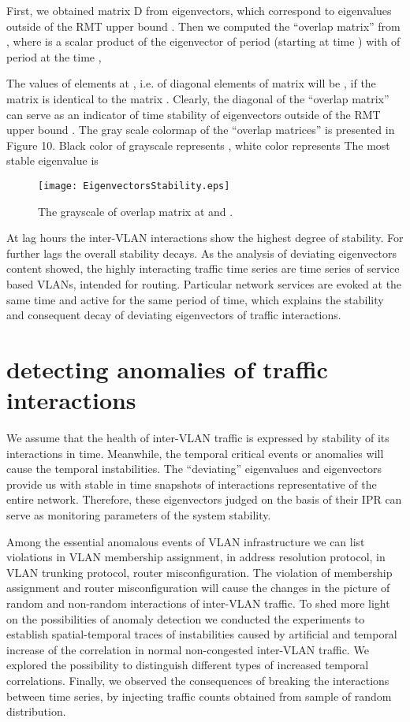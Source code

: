 \documentclass{IEEEtran}
\begin{document}
First, we obtained matrix D from  eigenvectors, which correspond
to  eigenvalues outside of the RMT upper bound .
Then we computed the {}``overlap matrix'' 
from , where  is a scalar product of the
eigenvector  of period  (starting at time ) with
 of period  at the time ,


The values of  elements at , i.e.
of diagonal elements of matrix  will be , if the matrix 
is identical to the matrix . Clearly, the diagonal
of the {}``overlap matrix''  can serve as an indicator of time
stability of  eigenvectors outside of the RMT upper bound .
The gray scale colormap of the {}``overlap matrices'' 
is presented in Figure 10. Black color of grayscale represents ,
white color represents  The most stable eigenvalue is
\begin{figure}[h]
\begin{center}\texttt{[image: EigenvectorsStability.eps]}\end{center}


\caption{\label{10} The grayscale of overlap matrix 
at  and . }
\end{figure}
At lag  hours the inter-VLAN interactions show the highest
degree of stability. For further lags the overall stability decays.
As the analysis of deviating eigenvectors content showed, the highly
interacting traffic time series are time series of service based VLANs,
intended for routing. Particular network services are evoked at the
same time and active for the same period of time, which explains the
stability and consequent decay of deviating eigenvectors of traffic
interactions.


\section{detecting anomalies of traffic interactions}

We assume that the health of inter-VLAN traffic is expressed by stability
of its interactions in time. Meanwhile, the temporal critical events
or anomalies will cause the temporal instabilities. The {}``deviating''
eigenvalues and eigenvectors provide us with stable in time snapshots
of interactions representative of the entire network. Therefore, these
eigenvectors judged on the basis of their IPR can serve as monitoring
parameters of the system stability.

Among the essential anomalous events of VLAN infrastructure we can
list violations in VLAN membership assignment, in address resolution
protocol, in VLAN trunking protocol, router misconfiguration. The
violation of membership assignment and router misconfiguration will
cause the changes in the picture of random and non-random interactions
of inter-VLAN traffic. To shed more light on the possibilities of
anomaly detection we conducted the experiments to establish spatial-temporal
traces of instabilities caused by artificial and temporal increase
of the correlation in normal non-congested inter-VLAN traffic. We
explored the possibility to distinguish different types of increased
temporal correlations. Finally, we observed the consequences of breaking
the interactions between time series, by injecting traffic counts
obtained from sample of random distribution. 
\end{document}
